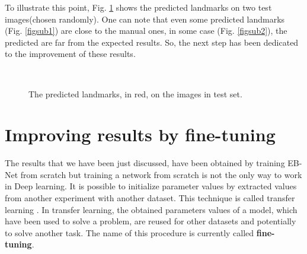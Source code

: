\documentclass[review]{elsarticle}
\begin{document}
To illustrate this point, Fig. \ref{figrsexample} shows the
predicted landmarks on two test images(chosen randomly). One can note that even some
predicted landmarks (Fig. \ref{figsub1}) are close to the manual ones,
in some case (Fig. \ref{figsub2}), the predicted are far from the
expected results. So, the next step has been dedicated to the
improvement of these results.
\begin{figure}[htbp]
    \centering
    ~~
\\    
    \caption{The predicted landmarks, in red,  on the images in test set.}
    \label{figrsexample}
\end{figure}
\section{Improving results by fine-tuning}
\label{sfineTuning}
The results that we have been just discussed, have been obtained by
training EB-Net from scratch but training a network from scratch is
not the only way to work in Deep learning. It is possible to
initialize parameter values by extracted values from another
experiment with another dataset. This technique is called transfer learning
\cite{torrey2009transfer}. In transfer learning, the obtained
parameters values of a model, which have been used to solve a problem,
are reused for other datasets \cite{margeta_mri} and potentially to
solve another task. The name of this procedure is currently called
\textbf{fine-tuning}. 
\end{document}
